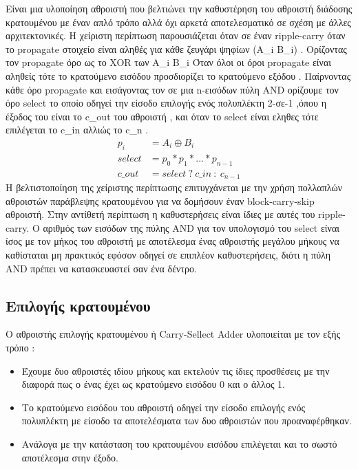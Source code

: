 Είναι μια υλοποίηση αθροιστή που βελτιώνει την καθυστέρηση του αθροιστή διάδοσης κρατουμένου με έναν απλό τρόπο αλλά όχι αρκετά αποτελεσματικό σε σχέση με άλλες αρχιτεκτονικές. 
Η χείριστη περίπτωση παρουσιάζεται όταν σε έναν ripple-carry όταν το propagate στοιχείο είναι αληθές για κάθε ζευγάρι ψηφίων (A\_i B\_i) .
Ορίζοντας τον propagate όρο ως το XOR των Α\_i B\_i 
Όταν όλοι οι όροι propagate είναι αληθείς τότε το κρατούμενο εισόδου προσδιορίζει το κρατούμενο εξόδου .
Παίρνοντας κάθε όρο propagate και εισάγοντας τον σε μια n-εισόδων πύλη AND ορίζουμε τον όρο select το οποίο οδηγεί την είσοδο επιλογής ενός πολυπλέκτη 2-σε-1 ,όπου η έξοδος του είναι το c\_out του αθροιστή , και όταν το select είναι εληθες τότε επιλέγεται το c\_in αλλιώς το c\_n .
\begin{equation}
\begin{split}
    p_i &= A_i \oplus B_i \\
    select &= p_0 * p_1 * ... * p_{n-1} \\
    c\_out &= select\ ?\ c\_in\ :\ c_{n-1} %
\end{split}
\end{equation}
Η βελτιστοποίηση της χείριστης περίπτωσης επιτυγχάνεται με την χρήση πολλαπλών αθροιστών παράβλεψης κρατουμένου για να δομήσουν έναν block-carry-skip αθροιστή. Στην αντίθετή περίπτωση η καθυστερήσεις είναι ίδιες με αυτές του ripple-carry.
Ο αριθμός των εισόδων της πύλης AND για τον υπολογισμό του select είναι ίσος με τον μήκος του αθροιστή με αποτέλεσμα ένας αθροιστής μεγάλου μήκους να καθίσταται μη πρακτικός εφόσον οδηγεί σε επιπλέον καθυστερήσεις, διότι η πύλη AND πρέπει να κατασκευαστεί σαν ένα δέντρο.   



\subsection{Επιλογής κρατουμένου}
Ο αθροιστής επιλογής κρατουμένου ή Carry-Sellect Adder υλοποιείται με τον εξής τρόπο :
\begin{itemize}
  \item Έχουμε δυο αθροιστές ιδίου μήκους και εκτελούν τις ίδιες προσθέσεις με την διαφορά πως ο ένας έχει ως κρατούμενο εισόδου 0 και ο άλλος 1.
  \item Το κρατούμενο εισόδου του αθροιστή οδηγεί την είσοδο επιλογής ενός πολυπλέκτη με είσοδο τα αποτελέσματα των δυο αθροιστών που προαναφέρθηκαν.
  \item Ανάλογα με την κατάσταση του κρατουμένου εισόδου επιλέγεται και το σωστό αποτέλεσμα στην έξοδο.
\end{itemize} 









